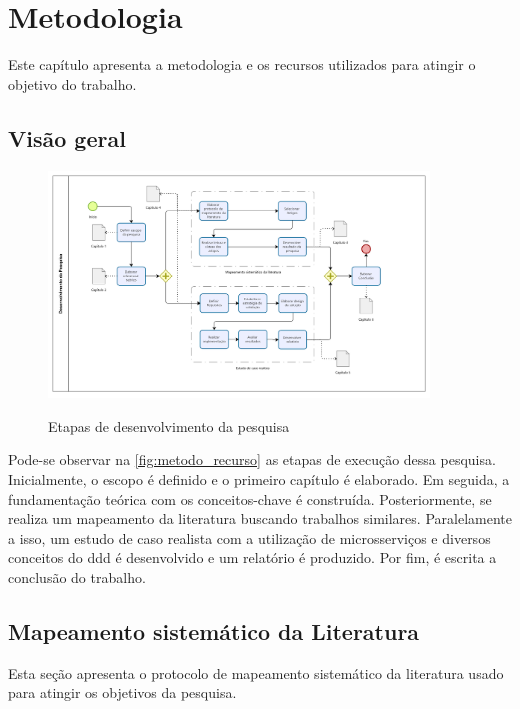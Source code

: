 \chapter{Metodologia}
\label{cap:metodologia}
Este capítulo apresenta a metodologia e os recursos utilizados para atingir o objetivo do trabalho.

\section{Visão geral}
\begin{figure}[h]
    \centering
    \caption{Etapas de desenvolvimento da pesquisa}
    \includegraphics[width=0.9\textwidth]{media/bpmn_metodo_recurso.png}
    \label{fig:metodo_recurso}
\end{figure}

Pode-se observar na \autoref{fig:metodo_recurso} as etapas de execução dessa pesquisa. Inicialmente, o escopo é definido e o primeiro capítulo é elaborado. Em seguida, a fundamentação teórica com os conceitos-chave é construída. Posteriormente, se realiza um mapeamento da literatura buscando trabalhos similares. Paralelamente a isso, um estudo de caso realista com a utilização de microsserviços e diversos conceitos do \acrshort{ddd} é desenvolvido e um relatório é produzido. Por fim, é escrita a conclusão do trabalho.

\section{Mapeamento sistemático da Literatura}
Esta seção apresenta o protocolo de mapeamento sistemático da literatura usado para atingir os objetivos da pesquisa.


